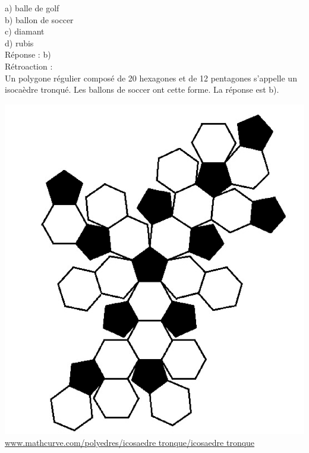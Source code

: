 \documentclass[letterpaper, 12pt]{article}
\begin{document}
a) balle de golf\\
b) ballon de soccer\\
c) diamant\\
d) rubis\\

R\'eponse : b)\\

R\'etroaction :\\
Un polygone r\'egulier compos\'e de 20 hexagones et de 12 pentagones s'appelle un isoca\`edre tronqu\'e. Les ballons de soccer ont cette forme. La r\'eponse est b).\\
\begin{center}
\includegraphics[scale=0.15]{unfolded_soccer_ball.eps}\\
\href{http://www.mathcurve.com/polyedres/icosaedre_tronque/icosaedre_tronque}{www.mathcurve.com/polyedres/icosaedre tronque/icosaedre tronque}\\[4mm]

\end{center}
\end{document}

